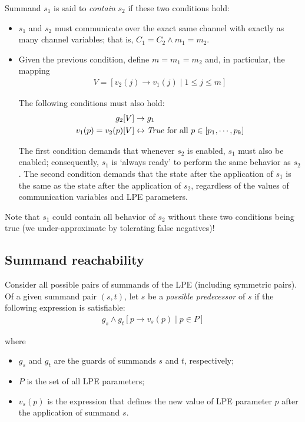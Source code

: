 Summand $s_1$ is said to \emph{contain} $s_2$ if these two conditions hold:

\begin{itemize}
\item $s_1$ and $s_2$ must communicate over the exact same channel with exactly as many channel variables; that is, $C_1 = C_2 \land m_1 = m_2$.

\item Given the previous condition, define $m = m_1 = m_2$ and, in particular, the mapping
\begin{align*}
V = [v_2(j) \rightarrow v_1(j) \;|\; 1 \leq j \leq m]
\end{align*}

The following conditions must also hold:
\begin{align*}
g_2[V] &\rightarrow g_1 \\
v_1(p) = v_2(p)[V] &\leftrightarrow \text{\textit{True}} \text{ for all } p \in [p_1, \cdots{}, p_k]
\end{align*}

The first condition demands that whenever $s_2$ is enabled, $s_1$ must also be enabled; consequently, $s_1$ is `always ready' to perform the same behavior as $s_2$.
The second condition demands that the state after the application of $s_1$ is the same as the state after the application of $s_2$, regardless of the values of communication variables and LPE parameters.
\end{itemize}

Note that $s_1$ could contain all behavior of $s_2$ without these two conditions being true (we under-approximate by tolerating false negatives)!

\subsection{Summand reachability}

Consider all possible pairs of summands of the LPE (including symmetric pairs).
Of a given summand pair $(s, t)$, let $s$ be a \emph{possible predecessor} of $s$ if the following expression is satisfiable:
\begin{align*}
g_s \land {g_t}[p \rightarrow v_s(p) \;|\; p \in P]
\end{align*}

where

\begin{itemize}
\item $g_s$ and $g_t$ are the guards of summands $s$ and $t$, respectively;
\item $P$ is the set of all LPE parameters;
\item $v_s(p)$ is the expression that defines the new value of LPE parameter $p$ after the application of summand $s$.
\end{itemize}

